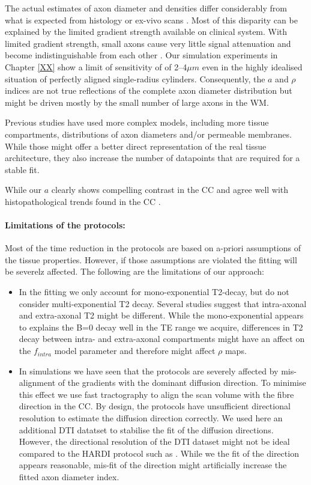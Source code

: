 The actual estimates of axon diameter and densities differ considerably from what is expected from histology or ex-vivo scans \citep{Alexander:2010}. Most of this disparity can be explained by the limited gradient strength available on clinical system.  With limited gradient strength, small axons cause very little signal attenuation and become indistinguishable from each other \citep{Yeh:XXXX, Latt:YYYY}. Our simulation experiments in Chapter \ref{XX} show a limit of sensitivity of of 2--4$\mu m$ even in the highly idealised situation of perfectly aligned single-radius cylinders. Consequently, the $a$ and $\rho$ indices are not true reflections of the complete axon diameter distribution but might be driven mostly by the small number of large axons in the WM. 

Previous studies have used more complex models, including more tissue compartments, distributions of axon diameters and/or permeable membranes. While those might offer a better direct representation of the real tissue architecture, they also increase the number of datapoints that are required for a stable fit. 

While our $a$ clearly shows compelling contrast in the CC and agree well with histopathological trends found in the CC \citep{Aboitiz}. 


\paragraph{Limitations of the \SFasym{} protocols: }
Most of the time reduction in the \SFasym{} protocols are based on a-priori assumptions of the tissue properties. However, if those assumptions are violated the fitting will be severelz affected. The following are the limitations of our approach:
\begin{itemize}
\item In the fitting we only account for mono-exponential T2-decay, but do not consider multi-exponential T2 decay. Several studies suggest that intra-axonal and extra-axonal T2 might be different. While the mono-exponential appears to explains the B=0 decay well in the TE range we acquire, differences in T2 decay between intra- and extra-axonal compartments might have an affect on the $f_{intra}$ model parameter and therefore might affect $\rho$ maps. 
\item In simulations we have seen that the \SF{} protocols are severely affected by mis-alignment of the gradients with the dominant diffusion direction. To minimise this effect we use fast tractography to align the scan volume with the fibre direction in the CC. By design, the \SF{} protocols have unsufficient directional resolution to estimate the diffusion direction correctly. We used here an additional DTI datatset to stabilise the fit of the diffusion directions. However, the directional resolution of the DTI dataset might not be ideal compared to the HARDI protocol such as \OI. While we the fit of the direction appears reasonable, mis-fit of the direction might artificially increase the fitted axon diameter index. 
\end{itemize}


